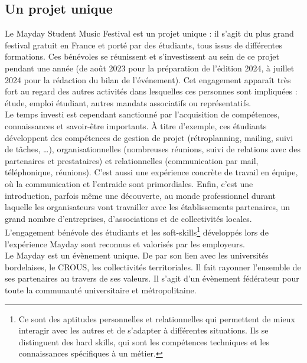 \documentclass[12pt,a4paper]{report}
\begin{document}
\subsection*{Un projet unique}

Le Mayday Student Music Festival est un projet unique : il s'agit du plus grand festival gratuit en France et porté par des étudiants, tous issus de différentes formations. Ces bénévoles se réunissent et s'investissent au sein de ce projet pendant une année (de août 2023 pour la préparation de l'édition 2024, à juillet 2024 pour la rédaction du bilan de l’événement). Cet engagement apparaît très fort au regard des autres activités dans lesquelles ces personnes sont impliquées : étude, emploi étudiant, autres mandats associatifs ou représentatifs.\\

\sloppy Le temps investi est cependant sanctionné par l'acquisition de compétences, connaissances et savoir-être importants. À titre d'exemple, ces étudiants développent des compétences de gestion de projet (rétroplanning, mailing, suivi de tâches, …), organisationnelles (nombreuses réunions, suivi de relations avec des partenaires et prestataires) et relationnelles (communication par mail, téléphonique, réunions). C’est aussi une expérience concrète de travail en équipe, où la communication et l'entraide sont primordiales. Enfin, c’est une introduction, parfois même une découverte, au monde professionnel durant laquelle les organisateurs vont travailler avec les établissements partenaires, un grand nombre d'entreprises, d’associations et de collectivités locales.\\

L’engagement bénévole des étudiants et les soft-skills\footnote{Ce sont des aptitudes personnelles et relationnelles qui permettent de mieux interagir avec les autres et de s'adapter à différentes situations. Ils se distinguent des hard skills, qui sont les compétences techniques et les connaissances spécifiques à un métier.} développés lors de l’expérience Mayday sont reconnus et valorisés par les employeurs.\\

Le Mayday est un évènement unique. De par son lien avec les universités bordelaises, le CROUS, les collectivités territoriales. Il fait rayonner l'ensemble de ses partenaires au travers de ses valeurs. Il s’agit d’un évènement fédérateur pour toute la communauté universitaire et métropolitaine.
\end{document}

